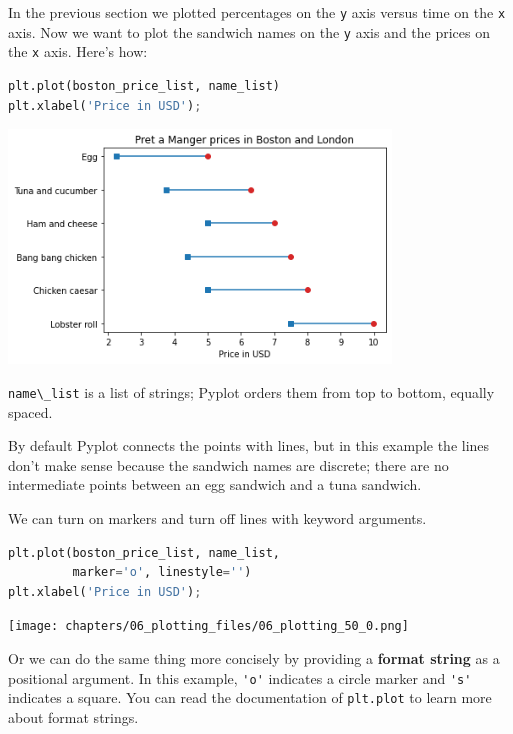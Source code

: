 In the previous section we plotted percentages on the
\passthrough{\lstinline!y!} axis versus time on the
\passthrough{\lstinline!x!} axis. Now we want to plot the sandwich names
on the \passthrough{\lstinline!y!} axis and the prices on the
\passthrough{\lstinline!x!} axis. Here's how:

\begin{lstlisting}[language=Python,style=source]
plt.plot(boston_price_list, name_list)
plt.xlabel('Price in USD');
\end{lstlisting}

\begin{center}
\includegraphics[width=4in]{chapters/06_plotting_files/06_plotting_48_0.png}
\end{center}

\passthrough{\lstinline!name\_list!} is a list of strings; Pyplot orders
them from top to bottom, equally spaced.

By default Pyplot connects the points with lines, but in this example
the lines don't make sense because the sandwich names are discrete;
there are no intermediate points between an egg sandwich and a tuna
sandwich.

We can turn on markers and turn off lines with keyword arguments.

\begin{lstlisting}[language=Python,style=source]
plt.plot(boston_price_list, name_list, 
         marker='o', linestyle='')
plt.xlabel('Price in USD');
\end{lstlisting}

\begin{center}
\texttt{[image: chapters/06\_plotting\_files/06\_plotting\_50\_0.png]}
\end{center}

Or we can do the same thing more concisely by providing a \textbf{format
string} as a positional argument. In this example,
\passthrough{\lstinline!'o'!} indicates a circle marker and
\passthrough{\lstinline!'s'!} indicates a square. You can read the
documentation of \passthrough{\lstinline!plt.plot!} to learn more about
format strings.


